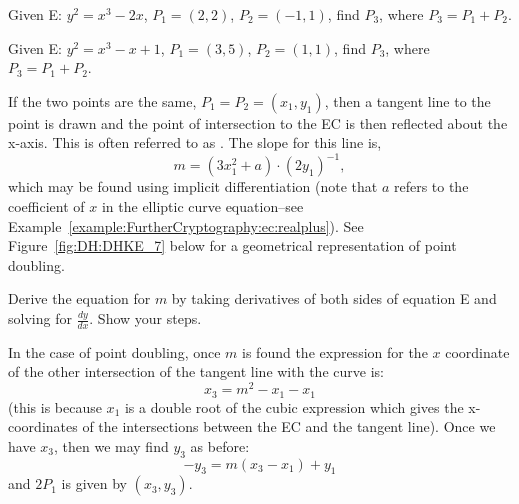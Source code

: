 \begin{exercise}{} Given E: $y^2 = x^3 - 2x$, $P_1 = (2, 2)$, $P_2 = (-1, 1)$, find $P_3$, where $P_3 = P_1 + P_2$.
\end{exercise}

\begin{exercise}{} Given E: $y^2 = x^3 - x + 1$, $P_1 = (3, 5)$, $P_2 = (1, 1)$, find $P_3$, where $P_3 = P_1 + P_2$.
\end{exercise}

If the two points are the same, $P_1 = P_2 = (x_1,y_1)$, then a tangent line to the point is drawn and the point of intersection to the EC is then reflected about the x-axis.  This is often referred to as . The slope for this line is, 
\[m = (3x_1^2 + a) \cdot (2y_1)^{-1},\] 
which may be found using implicit differentiation (note that $a$ refers to the coefficient of $x$ in the elliptic curve equation--see Example~\ref{example:FurtherCryptography:ec:realplus}).  See Figure~\ref{fig:DH:DHKE_7} below for a geometrical representation of point doubling.

\begin{exercise}{}
Derive the equation for $m$ by taking derivatives of both sides  of equation  E and solving for $\frac{dy}{dx}$. Show your steps.
\end{exercise}

In the case of point doubling, once $m$ is found the expression for  the $x$ coordinate of the other intersection of the tangent line with the curve is:
\[ x_3 = m^2 - x_1 - x_1\]
(this is because $x_1$ is a double root of the cubic expression which gives the x-coordinates of the intersections between the EC and the tangent line). Once we have $x_3$, then we may find $y_3$ as before:
\[ -y_3 = m(x_3-x_1) + y_1 \]
and $2P_1$ is given by $(x_3,y_3)$.

